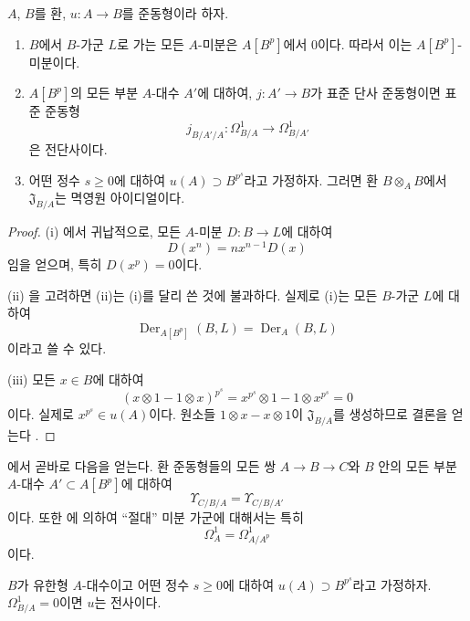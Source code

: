 \begin{proposition}[21.1.5]
\label{0.21.1.5-ko}
$A$, $B$를 환, $u:A\to B$를 준동형이라 하자.
\begin{enumerate}
  \item[\rm(i)] $B$에서 $B$-가군 $L$로 가는 모든 $A$-미분은
  $A[B^p]$에서 $0$이다. 따라서 이는 $A[B^p]$-미분이다.
  \item[\rm(ii)] $A[B^p]$의 모든 부분 $A$-대수 $A'$에 대하여,
  $j:A'\to B$가 표준 단사 준동형이면 표준 준동형
  \[
    j_{B/A'/A}:\Omega^1_{B/A}\longrightarrow\Omega^1_{B/A'}
  \]
  은 전단사이다.
  \item[\rm(iii)] 어떤 정수 $s\geq0$에 대하여
  $u(A)\supset B^{p^s}$라고 가정하자. 그러면 환 $B\otimes_A B$에서
  $\mathfrak J_{B/A}$는 멱영원 아이디얼이다.
\end{enumerate}
\end{proposition}

\begin{proof}
(i) 에서 귀납적으로, 모든 $A$-미분
$D:B\to L$에 대하여
\[
  D(x^n)=nx^{n-1}D(x)
\]
임을 얻으며, 특히 $D(x^p)=0$이다.

(ii) 을 고려하면 (ii)는 (i)를 달리 쓴 것에
불과하다. 실제로 (i)는 모든 $B$-가군 $L$에 대하여
\[
  \operatorname{Der}_{A[B^p]}(B,L)
  =\operatorname{Der}_A(B,L)
\]
이라고 쓸 수 있다.

(iii) 모든 $x\in B$에 대하여
\[
  (x\otimes1-1\otimes x)^{p^s}
  =x^{p^s}\otimes1-1\otimes x^{p^s}=0
\]
이다. 실제로 $x^{p^s}\in u(A)$이다. 원소들
$1\otimes x-x\otimes1$이 $\mathfrak J_{B/A}$를 생성하므로 결론을
얻는다 .
\end{proof}

에서 곧바로 다음을 얻는다. 환 준동형들의 모든 쌍
$A\to B\to C$와 $B$ 안의 모든 부분 $A$-대수
$A'\subset A[B^p]$에 대하여
\begin{equation}
\tag{21.1.5.1}
\label{0.21.1.5.1-ko}
  \Upsilon_{C/B/A}=\Upsilon_{C/B/A'}
\end{equation}
이다. 또한 에 의하여 ``절대'' 미분 가군에 대해서는
특히
\begin{equation}
\tag{21.1.5.2}
\label{0.21.1.5.2-ko}
  \Omega^1_A=\Omega^1_{A/A^p}
\end{equation}
이다.

\begin{corollary}[21.1.6]
\label{0.21.1.6-ko}
$B$가 유한형 $A$-대수이고 어떤 정수 $s\geq0$에 대하여
$u(A)\supset B^{p^s}$라고 가정하자. $\Omega^1_{B/A}=0$이면 $u$는
전사이다.
\end{corollary}

